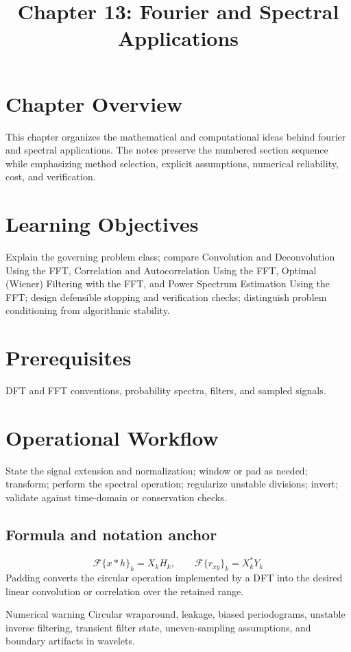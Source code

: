 \documentclass[10pt,letterpaper]{article}
\title{Chapter 13: Fourier and Spectral Applications}
\author{}
\date{}
\begin{document}
\maketitle

\section*{Chapter Overview}
This chapter organizes the mathematical and computational ideas behind fourier and spectral applications. The notes preserve the numbered section sequence while emphasizing method selection, explicit assumptions, numerical reliability, cost, and verification.

\section*{Learning Objectives}
Explain the governing problem class; compare Convolution and Deconvolution Using the FFT, Correlation and Autocorrelation Using the FFT, Optimal (Wiener) Filtering with the FFT, and Power Spectrum Estimation Using the FFT; design defensible stopping and verification checks; distinguish problem conditioning from algorithmic stability.

\section*{Prerequisites}
DFT and FFT conventions, probability spectra, filters, and sampled signals.

\section*{Operational Workflow}
State the signal extension and normalization; window or pad as needed; transform; perform the spectral operation; regularize unstable divisions; invert; validate against time-domain or conservation checks.

\subsection*{Formula and notation anchor}
\[
\mathcal{F}\{x*h\}_k=X_kH_k,\qquad \mathcal{F}\{r_{xy}\}_k=X_k^*Y_k
\]
Padding converts the circular operation implemented by a DFT into the desired linear convolution or correlation over the retained range.

\begin{warnbox}{Numerical warning}
Circular wraparound, leakage, biased periodograms, unstable inverse filtering, transient filter state, uneven-sampling assumptions, and boundary artifacts in wavelets.
\end{warnbox}
\end{document}
